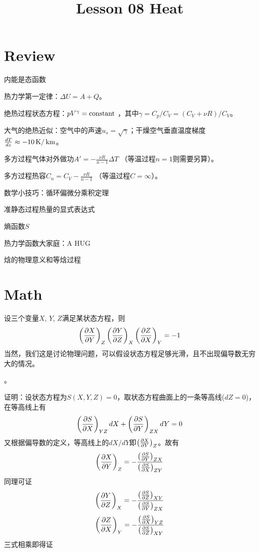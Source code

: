 \documentclass[CJK]{beamer}
\title{Lesson 08 Heat}
\author{}
\date{}
\begin{document}

\section{Review}

\begin{frame}
\bch
\bitem
\item{内能是态函数}
\item{热力学第一定律：$\Delta U = A + Q$。}
\item{绝热过程状态方程：$pV^\gamma = \mathrm{constant}$ ，其中$\gamma = C_p/C_V = (C_V + \nu R)/C_V$。}
\item{大气的绝热近似：空气中的声速$u_s =\sqrt{\gamma}$；干燥空气垂直温度梯度$\frac{dT}{dz} \approx -10 \,\mathrm{K}/\,\mathrm{km}$。}
\item{多方过程气体对外做功$A' = -\frac{\nu R}{n-1}\Delta T$ （等温过程$n=1$则需要另算）。}
\item{多方过程热容$C_n =C_V -\frac{\nu R}{n-1}$ （等温过程$C = \infty$）。}
\eitem
\ech
\end{frame}


\begin{frame}
\bch
\bitem
\item{数学小技巧：循环偏微分乘积定理}
\item{准静态过程热量的显式表达式}
\item{熵函数$S$}
\item{热力学函数大家庭：A HUG}
\item{焓的物理意义和等焓过程}
\eitem
\ech
\end{frame}

\section{Math}

\begin{frame}
\bch
设三个变量$X$, $Y$, $Z$满足某状态方程，则
{\blue 
$$\left(\frac{\partial X}{\partial Y}\right)_{Z}  \left(\frac{\partial Y}{\partial Z}\right)_{X} \left(\frac{\partial Z}{\partial X}\right)_{Y} = -1$$
}
当然，我们这是讨论物理问题，可以假设状态方程足够光滑，且不出现偏导数无穷大的情况。

\skipline

。
\ech
\end{frame}

\begin{frame}
\bch
{\scriptsize
证明：设状态方程为$S(X, Y, Z) = 0$，取状态方程曲面上的一条等高线($dZ = 0$)，在等高线上有
$$\left(\frac{\partial S}{\partial X}\right)_{YZ} dX + \left(\frac{\partial S}{\partial Y}\right)_{ZX} dY = 0$$
又根据偏导数的定义，等高线上的$dX/dY$即$\left(\frac{\partial X}{\partial Y}\right)_{Z}$。故有
$$\left(\frac{\partial X}{\partial Y}\right)_{Z} = -\frac{\left(\frac{\partial S}{\partial Y}\right)_{ZX}}{\left(\frac{\partial S}{\partial X}\right)_{ZY}}$$
同理可证
$$\left(\frac{\partial Y}{\partial Z}\right)_{X} = -\frac{\left(\frac{\partial S}{\partial Z}\right)_{XY}}{\left(\frac{\partial S}{\partial Y}\right)_{ZX}}$$
$$\left(\frac{\partial Z}{\partial X}\right)_{Y} = -\frac{\left(\frac{\partial S}{\partial X}\right)_{YZ}}{\left(\frac{\partial S}{\partial Z}\right)_{XY}}$$
三式相乘即得证
}
\ech
\end{frame}
\end{document}
